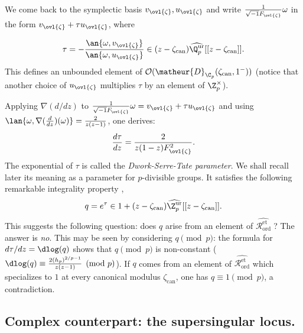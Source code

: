 \begin{para}\label{para-dwork-para}
 We come back to the symplectic basis $v_{\ovl{\zeta}}, u_{\ovl{\zeta}}$
 and write $\frac{1}{{\sqrt{-1} F_{\ovl{\zeta}}}} \omega$ in the form
 $v_{\ovl{\zeta}} + \tau u_{\ovl{\zeta}}$, where

 \begin{equation*}
 \tau = -\frac{\an{\omega,v_{\ovl{\zeta}}}}{\an{\omega,u_{\ovl{\zeta}}}}
  \in
  (z-{\zeta_{\mathrm{can}}})\widehat{{\Q}_p^{\mathrm{ur}}}[[z-{\zeta_{\mathrm{can}}}]].
 \end{equation*}
 This defines an unbounded element of
 $\mathcal{O}(\matheur{D}_{{\C}_p}(\zeta_{\mathrm{can}},1^-))$ (notice that
 another choice of $u_{\ovl{\zeta}}$ multiplies $\tau$ by an element of
 $\Z_p^{\times}$).

 \noindent Applying $\nabla(d/dz)$ to
 $\frac{1}{{\sqrt{-1}F_{\ovl{\zeta}}}} \omega = v_{\ovl{\zeta}} + \tau 
 u_{\ovl{\zeta}}$ and using $\lan{\omega,\nabla(\frac{d}{dz})(\omega)} =
 \frac{2}{z(z-1)}$, one derives:
 \begin{equation*}
 \frac{d\tau}{dz} = \frac{2}{z(1-z) F_{\ovl{\zeta}}^2}.
 \end{equation*}
 The exponential of $\tau$ is called the {\it Dwork-Serre-Tate
 parameter}.  We shall recall later its meaning as a parameter for
 $p$-divisible groups. It satisfies
 the following remarkable integrality property \cite[Th.4]{pc}, \cite{tdd}
 \begin{equation*}
 q = e^{\tau} \in 1 + (z-{\zeta_{\mathrm{can}}})
 \widehat{{\Z}_p^{\mathrm{ur}}}[[z-{\zeta_{\mathrm{can}}}]].
 \end{equation*}
 This suggests the following question: does $q$ arise from an element of
 $\widehat{\mathcal{R}_{\mathrm{ord}}^{\mathrm{et}}}\;$? The answer is
 \emph{no}. This may be seen by considering $q\pmod{p}$: the 
 formula for $d\tau/dz = \dlog(q)$ shows that $q\pmod{p}$ is non-constant
 ($\dlog(q) \equiv \frac{2(h_p)^{2/p-1}}{z(z-1)}\pmod{p}$).  If $q$ comes
 from an element of $\widehat{\mathcal{R}_{\mathrm{ord}}^{\mathrm{et}}}$ which
 specializes to $1$ at every canonical modulus $\zeta_{\mathrm{can}}$, one has 
 $q\equiv 1\pmod{p}$, a contradiction.
\end{para}

\subsection{Complex counterpart: the supersingular locus.}
\label{sub-complex-supersing}

